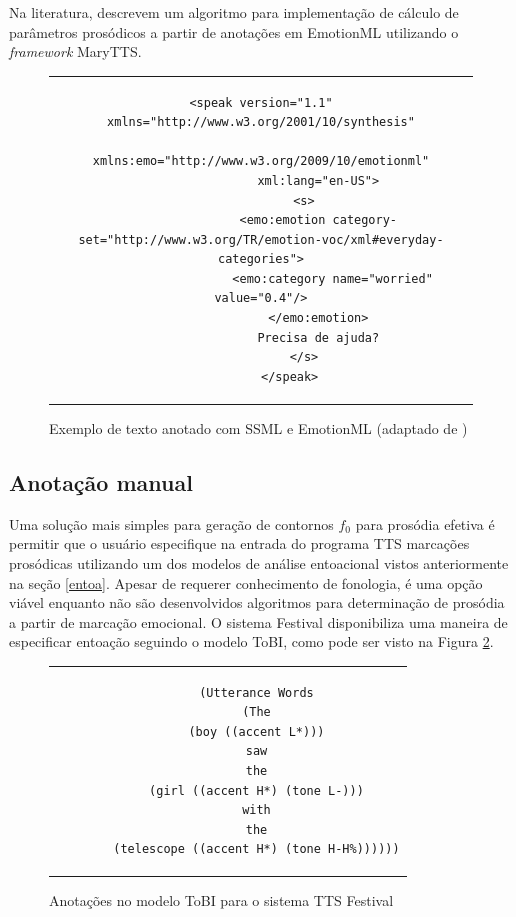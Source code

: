 Na literatura,  descrevem um algoritmo para implementação de
cálculo de parâmetros prosódicos a partir de anotações em EmotionML utilizando o
\emph{framework} MaryTTS.



\begin{figure}[thp]
    \centering
    \begin{tabular}{c}
        \begin{lstlisting}[]
        <speak version="1.1" xmlns="http://www.w3.org/2001/10/synthesis"
                xmlns:emo="http://www.w3.org/2009/10/emotionml"
                xml:lang="en-US">
            <s>
                <emo:emotion category-set="http://www.w3.org/TR/emotion-voc/xml#everyday-categories">
                    <emo:category name="worried" value="0.4"/>
                </emo:emotion>
                Precisa de ajuda?
            </s>
        </speak>
        \end{lstlisting}
    \end{tabular}
    \caption{Exemplo de texto anotado com SSML e EmotionML (adaptado de ) \label{lst:ssmlemotion}}
\end{figure}


\subsection{Anotação manual}
Uma solução mais simples para geração de contornos $ f_0 $ para prosódia efetiva é
permitir que o usuário especifique na entrada do programa TTS marcações
prosódicas utilizando um dos modelos de análise entoacional vistos
anteriormente na seção \ref{entoa}. Apesar de requerer conhecimento de
fonologia, é uma opção viável enquanto não são desenvolvidos algoritmos para
determinação de prosódia a partir de marcação emocional. O sistema Festival
\cite{festival} disponibiliza uma maneira de especificar entoação seguindo o
modelo ToBI, como pode ser visto na Figura \ref{tobifest}.

\begin{figure}[thp]
    \centering
    \begin{tabular}{c}
        \begin{lstlisting}
        (Utterance Words
        (The
        (boy ((accent L*)))
        saw
        the
        (girl ((accent H*) (tone L-)))
        with
        the
        (telescope ((accent H*) (tone H-H%))))))
        \end{lstlisting}
    \end{tabular}
    \caption{Anotações no modelo ToBI para o sistema TTS Festival \label{tobifest}}
\end{figure}
